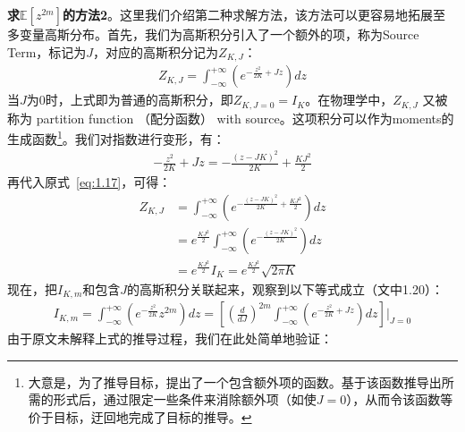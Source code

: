\textbf{求$\mathbb{E}[z^{2m}]$的方法2}。这里我们介绍第二种求解方法，该方法可以更容易地拓展至多变量高斯分布。首先，我们为高斯积分引入了一个额外的项，称为Source Term，标记为$J$，对应的高斯积分记为$Z_{K,J}$：
\begin{equation}
    \begin{split}
    \label{eq:1.17}
    Z_{K,J} = \int_{-\infty}^{+\infty} 
        \left(
            e^{-\frac{z^2}{2K} + Jz}
        \right) dz
    \end{split}
\end{equation}
当$J$为$0$时，上式即为普通的高斯积分，即$Z_{K,J=0} = I_K$。在物理学中，$Z_{K,J}$ 又被称为 partition function （配分函数） with source。这项积分可以作为moments的生成函数\footnote{大意是，为了推导目标，提出了一个包含额外项的函数。基于该函数推导出所需的形式后，通过限定一些条件来消除额外项（如使$J=0$），从而令该函数等价于目标，迂回地完成了目标的推导。}。我们对指数进行变形，有：
\begin{equation}
    \begin{split}
    -\frac{z^2}{2K} + Jz = - \frac{(z-JK)^2}{2K} + \frac{KJ^2}{2}
    \end{split}
\end{equation}
再代入原式~\eqref{eq:1.17}，可得：
\begin{equation}
    \begin{split}
        \label{eq:1.19}
        Z_{K,J} & = \int_{-\infty}^{+\infty} 
        \left(
            e^{- \frac{(z-JK)^2}{2K} + \frac{KJ^2}{2}}
        \right) dz \\
        & = e^{\frac{KJ^2}{2}} \int_{-\infty}^{+\infty} 
        \left(
            e^{- \frac{(z-JK)^2}{2K}}
        \right) dz \\
        & = e^{\frac{KJ^2}{2}} I_K 
          = e^{\frac{KJ^2}{2}} \sqrt{2\pi K} 
    \end{split}
\end{equation}
现在，把$I_{K,m}$和包含$J$的高斯积分关联起来，观察到以下等式成立（文中1.20）：
\begin{equation}
    \begin{split}
    \label{eq:1.20}
    I_{K,m} 
    = \int_{-\infty}^{+\infty} 
    \left(
        e^{-\frac{z^2}{2K}} z^{2m}
    \right) dz
    = \left[
        (\frac{d}{dJ})^{2m} \int_{-\infty}^{+\infty}{
            (e^{-\frac{z^2}{2K} + Jz})    
        dz
        }
    \right] \bigg|_{J=0} 
    \end{split}
\end{equation}
由于原文未解释上式的推导过程，我们在此处简单地验证：
